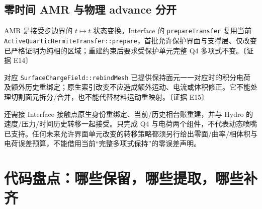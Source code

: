 \documentclass[UTF8,a4paper,11pt,fontset=fandol]{ctexart}
\newcommand{\code}[1]{\nolinkurl{#1}}
\newcommand{\ev}[1]{{\small\color{muted}〔证据 #1〕}}
\begin{document}
\subsection{零时间 AMR 与物理 advance 分开}
AMR 是接受步边界的 $t\mapsto t$ 状态变换。Interface 的 \code{prepareTransfer} 复用当前 \code{ActiveQuarticHermiteTransfer::prepare}，首批允许保护界面与支撑层、仅改变已严格证明为纯相的区域；重建约束后要求受保护单元完整 Q4 多项式不变。\ev{E14}

对应 \code{SurfaceChargeField::rebindMesh} 已提供保持面元一一对应时的积分电荷及额外历史重绑定；原生索引改变不应造成额外运动、电流或体积修正。它不能处理切割面元拆分/合并，也不能代替材料运动重映射。\ev{E15}

还需接 Interface 接触点原生身份重绑定、当前/历史相台账重建，并与 Hydro 的速度/压力/时间历史转移一起接受。只完成 Q4 与电荷两个组件，不代表动态喷嘴已支持。任何未来允许界面单元改变的转移策略都须另行给出零面/曲率/相体积与电荷误差预算，不能借用当前“完整多项式保持”的零误差声明。

\section{代码盘点：哪些保留，哪些提取，哪些补齐}
\end{document}
